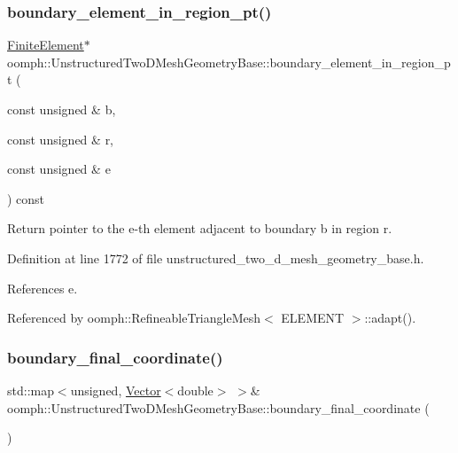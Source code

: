 \subsubsection{\texorpdfstring{boundary\+\_\+element\+\_\+in\+\_\+region\+\_\+pt()}{boundary\_element\_in\_region\_pt()}}
{\footnotesize\ttfamily \hyperlink{classoomph_1_1FiniteElement}{Finite\+Element}$\ast$ oomph\+::\+Unstructured\+Two\+D\+Mesh\+Geometry\+Base\+::boundary\+\_\+element\+\_\+in\+\_\+region\+\_\+pt (\begin{DoxyParamCaption}\item[{const unsigned \&}]{b,  }\item[{const unsigned \&}]{r,  }\item[{const unsigned \&}]{e }\end{DoxyParamCaption}) const\hspace{0.3cm}{\ttfamily [inline]}}



Return pointer to the e-\/th element adjacent to boundary b in region r. 



Definition at line 1772 of file unstructured\+\_\+two\+\_\+d\+\_\+mesh\+\_\+geometry\+\_\+base.\+h.



References e.



Referenced by oomph\+::\+Refineable\+Triangle\+Mesh$<$ E\+L\+E\+M\+E\+N\+T $>$\+::adapt().

\mbox{\label{classoomph_1_1UnstructuredTwoDMeshGeometryBase_a20fb1983af13d17646e665bd0128d20c}} 
\subsubsection{\texorpdfstring{boundary\+\_\+final\+\_\+coordinate()}{boundary\_final\_coordinate()}\hspace{0.1cm}{\footnotesize\ttfamily [1/2]}}
{\footnotesize\ttfamily std\+::map$<$unsigned, \hyperlink{classoomph_1_1Vector}{Vector}$<$double$>$ $>$\& oomph\+::\+Unstructured\+Two\+D\+Mesh\+Geometry\+Base\+::boundary\+\_\+final\+\_\+coordinate (\begin{DoxyParamCaption}{ }\end{DoxyParamCaption})\hspace{0.3cm}{\ttfamily [inline]}}



